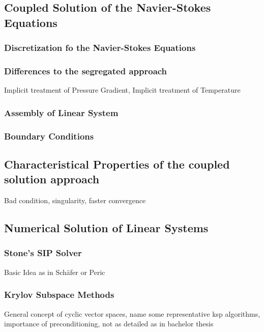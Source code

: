 \documentclass[article,type=msc,colorback,accentcolor=tud2a]{tudthesis}
\begin{document}
    \subsection{Coupled Solution of the Navier-Stokes Equations}

      \subsubsection{Discretization fo the Navier-Stokes Equations}
      \subsubsection{Differences to the segregated approach}

        Implicit treatment of Pressure Gradient, Implicit treatment of Temperature

      \subsubsection{Assembly of Linear System}

      \subsubsection{Boundary Conditions}

      \subsection{Characteristical Properties of the coupled solution approach}

      Bad condition, singularity, faster convergence

      \subsection{Numerical Solution of Linear Systems}

        \subsubsection{Stone's SIP Solver}
        Basic Idea as in Schäfer or Peric
        \subsubsection{Krylov Subspace Methods}
        General concept of cyclic vector spaces, name some representative ksp algorithms, importance of preconditioning, not as detailed as in bachelor thesis
\end{document}
